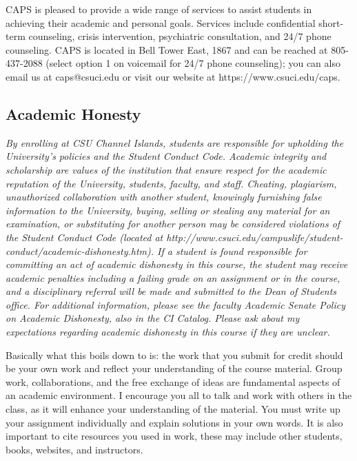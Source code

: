 \documentclass[
  letterpaper,
  DIV=11,
  numbers=noendperiod]{scrartcl}
\begin{document}
CAPS is pleased to provide a wide range of services to assist students
in achieving their academic and personal goals. Services include
confidential short-term counseling, crisis intervention, psychiatric
consultation, and 24/7 phone counseling. CAPS is located in Bell Tower
East, 1867 and can be reached at 805-437-2088 (select option 1 on
voicemail for 24/7 phone counseling); you can also email us at
caps@csuci.edu or visit our website at https://www.csuci.edu/caps.

\subsection{Academic Honesty}\label{academic-honesty}

\emph{By enrolling at CSU Channel Islands, students are responsible for
upholding the University's policies and the Student Conduct Code.
Academic integrity and scholarship are values of the institution that
ensure respect for the academic reputation of the University, students,
faculty, and staff. Cheating, plagiarism, unauthorized collaboration
with another student, knowingly furnishing false information to the
University, buying, selling or stealing any material for an examination,
or substituting for another person may be considered violations of the
Student Conduct Code (located at
http://www.csuci.edu/campuslife/student-conduct/academic-dishonesty.htm).
If a student is found responsible for committing an act of academic
dishonesty in this course, the student may receive academic penalties
including a failing grade on an assignment or in the course, and a
disciplinary referral will be made and submitted to the Dean of Students
office. For additional information, please see the faculty Academic
Senate Policy on Academic Dishonesty, also in the CI Catalog. Please ask
about my expectations regarding academic dishonesty in this course if
they are unclear.}

Basically what this boils down to is: the work that you submit for
credit should be your own work and reflect your understanding of the
course material. Group work, collaborations, and the free exchange of
ideas are fundamental aspects of an academic environment. I encourage
you all to talk and work with others in the class, as it will enhance
your understanding of the material. You must write up your assignment
individually and explain solutions in your own words. It is also
important to cite resources you used in work, these may include other
students, books, websites, and instructors.
\end{document}

